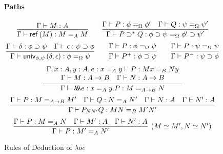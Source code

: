 \begin{figure}
\begin{framed}
\paragraph{Paths}
\[ \infer{\Gamma \vdash \reff{M} : M =_A M}{\Gamma \vdash M : A}
\qquad
\infer{\Gamma \vdash P \supset^* Q : \phi \supset \psi =_\Omega \phi' \supset \psi'}{\Gamma \vdash P : \phi =_\Omega \phi' \quad \Gamma \vdash Q : \psi =_\Omega \psi'} \]
\[ \infer{\Gamma \vdash \univ{\phi}{\psi}{\delta}{\epsilon} : \phi =_\Omega \psi}{\Gamma \vdash \delta : \phi \supset \psi \quad \Gamma \vdash \epsilon : \psi \supset \phi} 
\qquad
\infer{\Gamma \vdash P^+ : \phi \supset \psi}{\Gamma \vdash P : \phi =_\Omega \psi}
\qquad
\infer{\Gamma \vdash P^- : \psi \supset \phi}{\Gamma \vdash P : \psi =_\Omega \psi} \]
\[ \infer{\Gamma \vdash \triplelambda e : x =_A y . P : M =_{A \rightarrow B} N}
  {\begin{array}{c}
     \Gamma, x : A, y : A, e : x =_A y \vdash P : M x =_B N y \\
     \Gamma \vdash M : A \rightarrow B \quad
\Gamma \vdash N : A \rightarrow B
     \end{array}} \]
\[ \infer{\Gamma \vdash P_{NN'}Q : MN =_B M' N'}{\Gamma \vdash P : M =_{A \rightarrow B} M' \quad \Gamma \vdash Q : N =_A N' \quad \Gamma \vdash N : A \quad \Gamma \vdash N' : A} \]
\[ \infer[(M \simeq M', N \simeq N')]{\Gamma \vdash P : M' =_A N'}{\Gamma \vdash P : M =_A N \quad \Gamma \vdash M' : A \quad \Gamma \vdash N' : A} \]
\end{framed}
\caption{Rules of Deduction of $\lambda oe$}
\label{fig:lambdaoe}
\end{figure}

